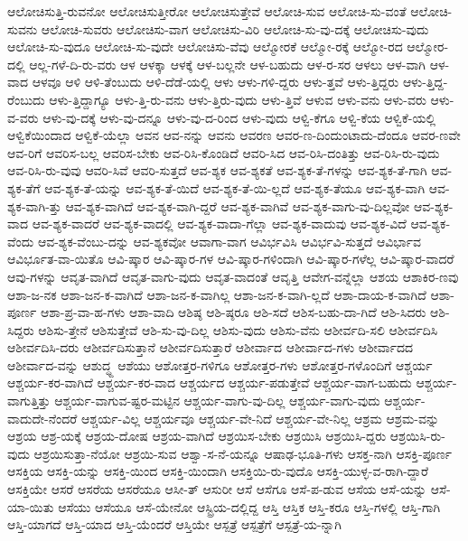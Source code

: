 {ಆಲೋಚಿಸುತ್ತಿ-ರುವನೋ
ಆಲೋಚಿಸುತ್ತೀರೋ
ಆಲೋಚಿಸುತ್ತೇವೆ
ಆಲೋಚಿ-ಸುವ
ಆಲೋಚಿ-ಸು-ವಂತೆ
ಆಲೋಚಿ-ಸುವನು
ಆಲೋಚಿ-ಸುವರು
ಆಲೋಚಿಸು-ವಾಗ
ಆಲೋಚಿಸು-ವಿರಿ
ಆಲೋಚಿ-ಸು-ವು-ದಕ್ಕೆ
ಆಲೋಚಿಸು-ವುದು
ಆಲೋಚಿ-ಸು-ವುದೂ
ಆಲೋಚಿ-ಸು-ವುದೇ
ಆಲೋಚಿಸು-ವೆವು
ಆಲ್ಮೋರಕೆ
ಆಲ್ಮೋ-ರಕ್ಕೆ
ಆಲ್ಮೋ-ರದ
ಆಲ್ಮೋರ-ದಲ್ಲಿ
ಆಲ್ಲ-ಗಳೆ-ದಿ-ರು-ವರು
ಆಳ
ಆಳಕ್ಕಾ
ಆಳಕ್ಕೆ
ಆಳ-ಬಲ್ಲನೇ
ಆಳ-ಬಹುದು
ಆಳ-ರ-ಸರ
ಆಳಲು
ಆಳ-ವಾಗಿ
ಆಳ-ವಾದ
ಆಳವೂ
ಆಳಿ
ಆಳಿ-ತೆಂಬುದು
ಆಳಿ-ದೆಡೆ-ಯಲ್ಲಿ
ಆಳು
ಆಳು-ಗಳಿ-ದ್ದರು
ಆಳು-ತ್ತವೆ
ಆಳು-ತ್ತಿದ್ದರು
ಆಳು-ತ್ತಿದ್ದ-ರೆಂಬುದು
ಆಳು-ತ್ತಿದ್ದಾಗ್ಯೂ
ಆಳು-ತ್ತಿ-ರು-ವನು
ಆಳು-ತ್ತಿರು-ವುದು
ಆಳು-ತ್ತಿವೆ
ಆಳುವ
ಆಳು-ವನು
ಆಳು-ವರು
ಆಳು-ವ-ವರು
ಆಳು-ವು-ದಕ್ಕೆ
ಆಳು-ವು-ದನ್ನೂ
ಆಳು-ವು-ದ-ರಿಂದ
ಆಳು-ವುದು
ಆಳ್ವಿ-ಕೆಗೂ
ಆಳ್ವಿ-ಕೆಯ
ಆಳ್ವಿಕೆ-ಯಲ್ಲಿ
ಆಳ್ವಿಕೆಯಿಂದಾದ
ಆಳ್ವಿಕೆ-ಯೆಲ್ಲಾ
ಆವನ
ಆವ-ನನ್ನು
ಆವನು
ಆವರಣ
ಆವರ-ಣ-ದಿಂದುಂಟಾದು-ದೆಂದೂ
ಆವರ-ಣವೇ
ಆವ-ರಿಗೆ
ಆವರಿಸ-ಬಲ್ಲ
ಆವರಿಸ-ಬೇಕು
ಆವ-ರಿಸಿ-ಕೊಂಡಿದೆ
ಆವರಿ-ಸಿದ
ಆವ-ರಿಸಿ-ದಂತಿತ್ತು
ಆವ-ರಿಸಿ-ರು-ವುದು
ಆವ-ರಿಸಿ-ರು-ವುವು
ಆವರಿ-ಸಿವೆ
ಆವರಿ-ಸುತ್ತದೆ
ಆವ-ಶ್ಯಕ
ಆವ-ಶ್ಯಕತೆ
ಆವ-ಶ್ಯಕ-ತೆ-ಗಳನ್ನು
ಆವ-ಶ್ಯಕ-ತೆ-ಗಾಗಿ
ಆವ-ಶ್ಯಕ-ತೆಗೆ
ಆವ-ಶ್ಯಕ-ತೆ-ಯನ್ನು
ಆವ-ಶ್ಯಕ-ತೆ-ಯಿದೆ
ಆವ-ಶ್ಯಕ-ತೆ-ಯಿ-ಲ್ಲದೆ
ಆವ-ಶ್ಯಕ-ತೆಯೂ
ಆವ-ಶ್ಯಕ-ವಾಗಿ
ಆವ-ಶ್ಯಕ-ವಾಗಿ-ತ್ತು
ಆವ-ಶ್ಯಕ-ವಾಗಿದೆ
ಆವ-ಶ್ಯಕ-ವಾಗಿ-ದ್ದರೆ
ಆವ-ಶ್ಯಕ-ವಾಗಿವೆ
ಆವ-ಶ್ಯಕ-ವಾಗು-ವು-ದಿಲ್ಲವೋ
ಆವ-ಶ್ಯಕ-ವಾದ
ಆವ-ಶ್ಯಕ-ವಾದರೆ
ಆವ-ಶ್ಯಕ-ವಾದಲ್ಲಿ
ಆವ-ಶ್ಯಕ-ವಾದಾ-ಗೆಲ್ಲಾ
ಆವ-ಶ್ಯಕ-ವಾದುವು
ಆವ-ಶ್ಯಕ-ವಿದೆ
ಆವ-ಶ್ಯಕ-ವೆಂದು
ಆವ-ಶ್ಯಕ-ವೆಂಬು-ದನ್ನು
ಆವ-ಶ್ಯಕವೋ
ಆವಾಗಾ-ವಾಗ
ಆವಿರ್ಭವಿಸಿ
ಆವಿರ್ಭವಿ-ಸುತ್ತದೆ
ಆವಿರ್ಭಾವ
ಆವಿರ್ಭೂತ-ವಾ-ಯಿತೊ
ಆವಿ-ಷ್ಕಾರ
ಆವಿ-ಷ್ಕಾರ-ಗಳ
ಆವಿ-ಷ್ಕಾರ-ಗಳಿಂದಾಗಿ
ಆವಿ-ಷ್ಕಾರ-ಗಳೆಲ್ಲ
ಆವಿ-ಷ್ಕಾರ-ವಾದರೆ
ಆವು-ಗಳನ್ನು
ಆವೃತ-ವಾಗಿದೆ
ಆವೃತ-ವಾಗು-ವುದು
ಆವೃತ-ವಾದಂತೆ
ಆವೃತ್ತಿ
ಆವೇಗ-ವನ್ನೆಲ್ಲಾ
ಆಶಯ
ಆಶಾಕಿರ-ಣವು
ಆಶಾ-ಜ-ನಕ
ಆಶಾ-ಜನ-ಕ-ವಾಗಿದೆ
ಆಶಾ-ಜನ-ಕ-ವಾಗಿಲ್ಲ
ಆಶಾ-ಜನ-ಕ-ವಾಗಿ-ಲ್ಲದೆ
ಆಶಾ-ದಾಯ-ಕ-ವಾಗಿದೆ
ಆಶಾ-ಪೂರ್ಣ
ಆಶಾ-ಪ್ರ-ವಾ-ಹ-ಗಳು
ಆಶಾ-ವಾದಿ
ಆಶಿಷ್ಠ
ಆಶಿ-ಷ್ಠರೂ
ಆಶಿ-ಸದೆ
ಆಶಿಸ-ಬಹು-ದಾ-ಗಿದೆ
ಆಶಿ-ಸಿದರು
ಆಶಿ-ಸಿದ್ದರು
ಆಶಿಸು-ತ್ತೇನೆ
ಆಶಿಸುತ್ತೇವೆ
ಆಶಿ-ಸು-ವು-ದಿಲ್ಲ
ಆಶಿಸು-ವುದು
ಆಶಿಸು-ವೆನು
ಆಶೀರ್ವದಿ-ಸಲಿ
ಆಶೀರ್ವದಿಸಿ
ಆಶೀರ್ವದಿಸಿ-ದರು
ಆಶೀರ್ವದಿಸುತ್ತಾನೆ
ಆಶೀರ್ವದಿಸುತ್ತಾರೆ
ಆಶೀರ್ವಾದ
ಆಶೀರ್ವಾದ-ಗಳು
ಆಶೀರ್ವಾದದ
ಆಶೀರ್ವಾದ-ವನ್ನು
ಆಶುದ್ಧ್ದ
ಆಶೆಯು
ಆಶೋತ್ತರ-ಗಳಿಗೂ
ಆಶೋತ್ತರ-ಗಳು
ಆಶೋತ್ತರ-ಗಳೊಂದಿಗೆ
ಆಶ್ಚರ್ಯ
ಆಶ್ಚರ್ಯ-ಕರ-ವಾಗಿದೆ
ಆಶ್ಚರ್ಯ-ಕರ-ವಾದ
ಆಶ್ಚರ್ಯದ
ಆಶ್ಚರ್ಯ-ಪಡುತ್ತೇವೆ
ಆಶ್ಚರ್ಯ-ವಾಗ-ಬಹುದು
ಆಶ್ಚರ್ಯ-ವಾಗುತ್ತಿತ್ತು
ಆಶ್ಚರ್ಯ-ವಾಗುವ-ಷ್ಟರ-ಮಟ್ಟಿನ
ಆಶ್ಚರ್ಯ-ವಾಗು-ವು-ದಿಲ್ಲ
ಆಶ್ಚರ್ಯ-ವಾಗು-ವುದು
ಆಶ್ಚರ್ಯ-ವಾದುದೇ-ನೆಂದರೆ
ಆಶ್ಚರ್ಯ-ವಿಲ್ಲ
ಆಶ್ಚರ್ಯವೂ
ಆಶ್ಚರ್ಯ-ವೇ-ನಿದೆ
ಆಶ್ಚರ್ಯ-ವೇ-ನಿಲ್ಲ
ಆಶ್ರಮ
ಆಶ್ರಮ-ವನ್ನು
ಆಶ್ರಯ
ಆಶ್ರ-ಯಕ್ಕೆ
ಆಶ್ರಯ-ದೋಷ
ಆಶ್ರಯ-ವಾಗಿದೆ
ಆಶ್ರಯಿಸ-ಬೇಕು
ಆಶ್ರಯಿಸಿ
ಆಶ್ರಯಿಸಿ-ದ್ದರು
ಆಶ್ರಯಿಸಿ-ರು-ವುದು
ಆಶ್ರಯಿಸುತ್ತಾ-ನೆಯೋ
ಆಶ್ರಯಿ-ಸುವ
ಆಶ್ವಾ-ಸ-ನೆ-ಯನ್ನೂ
ಆಷಾಢ-ಭೂತಿ-ಗಳು
ಆಸಕ್ತ-ನಾಗಿ
ಆಸಕ್ತಿ-ಪೂರ್ಣ
ಆಸಕ್ತಿಯ
ಆಸಕ್ತಿ-ಯನ್ನು
ಆಸಕ್ತಿ-ಯಿಂದ
ಆಸಕ್ತಿ-ಯಿಂದಾಗಿ
ಆಸಕ್ತಿಯಿ-ರು-ವುದೊ
ಆಸಕ್ತಿ-ಯುಳ್ಳ-ವ-ರಾಗಿ-ದ್ದಾರೆ
ಆಸಕ್ತಿಯೇ
ಆಸರೆ
ಆಸರೆಯ
ಆಸರೆಯೂ
ಆಸೀ-ತ್
ಆಸುರೀ
ಆಸೆ
ಆಸೆಗೂ
ಆಸೆ-ಪ-ಡುವ
ಆಸೆಯ
ಆಸೆ-ಯನ್ನು
ಆಸೆ-ಯಾ-ಯಿತು
ಆಸೆಯು
ಆಸೆಯೂ
ಆಸೆ-ಯೇನೋ
ಆಸ್ಟ್ರಿಯ-ದಲ್ಲಿದ್ದ
ಆಸ್ತಿ
ಆಸ್ತಿಕ
ಆಸ್ತಿ-ಕರೂ
ಆಸ್ತಿ-ಗಳಲ್ಲಿ
ಆಸ್ತಿ-ಗಾಗಿ
ಆಸ್ತಿ-ಯಾಗದೆ
ಆಸ್ತಿ-ಯಾದ
ಆಸ್ತಿ-ಯೆಂದರೆ
ಆಸ್ತಿಯೇ
ಆಸ್ಪತ್ರೆ
ಆಸ್ಪತ್ರೆಗೆ
ಆಸ್ಪತ್ರೆ-ಯ-ನ್ನಾಗಿ
}
